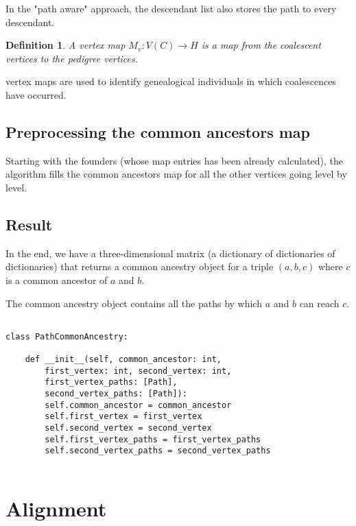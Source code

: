 \documentclass[14pt]{extarticle}
\newtheorem{definition}{Definition}
\begin{document}
In the "path aware" approach, the descendant list also stores the path to every descendant.



\begin{definition}
A vertex map $M_v:V(C) \rightarrow H$ is a map from the coalescent vertices to the pedigree vertices.   
\end{definition}
vertex maps are used to identify genealogical individuals in which coalescences have occurred. 

\subsection{Preprocessing the common ancestors map}

Starting with the founders (whose map entries has been already calculated), the algorithm fills the common ancestors map for all the other vertices going level by level.

\subsection{Result}

In the end, we have a three-dimensional matrix (a dictionary of dictionaries of dictionaries) that returns a common ancestry object for a triple $(a, b, c)$ where $c$ is a common ancestor of $a$ and $b$.

The common ancestry object contains all the paths by which $a$ and $b$ can reach $c$.

\begin{lstlisting}

class PathCommonAncestry:
	
	def __init__(self, common_ancestor: int,
		first_vertex: int, second_vertex: int,
		first_vertex_paths: [Path],
		second_vertex_paths: [Path]):
		self.common_ancestor = common_ancestor
		self.first_vertex = first_vertex
		self.second_vertex = second_vertex
		self.first_vertex_paths = first_vertex_paths
		self.second_vertex_paths = second_vertex_paths
	

\end{lstlisting}

\newpage

\section{Alignment}

\vspace*{-\baselineskip}
\end{document}
